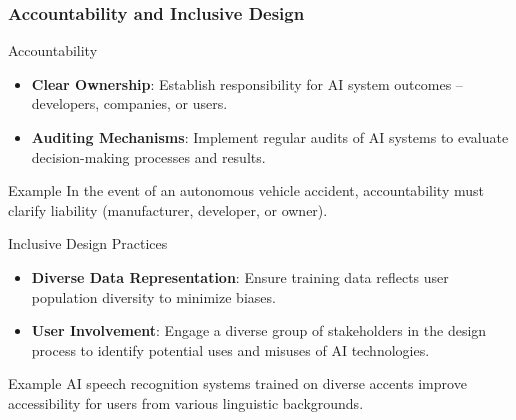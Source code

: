\documentclass[aspectratio=169]{beamer}
\begin{document}
\begin{frame}[fragile]
    \frametitle{Accountability and Inclusive Design}

    \begin{block}{Accountability}
        \begin{itemize}
            \item \textbf{Clear Ownership}: Establish responsibility for AI system outcomes – developers, companies, or users.
            \item \textbf{Auditing Mechanisms}: Implement regular audits of AI systems to evaluate decision-making processes and results.
        \end{itemize}
        \begin{block}{Example}
            In the event of an autonomous vehicle accident, accountability must clarify liability (manufacturer, developer, or owner).
        \end{block}
    \end{block}

    \begin{block}{Inclusive Design Practices}
        \begin{itemize}
            \item \textbf{Diverse Data Representation}: Ensure training data reflects user population diversity to minimize biases.
            \item \textbf{User Involvement}: Engage a diverse group of stakeholders in the design process to identify potential uses and misuses of AI technologies.
        \end{itemize}
        \begin{block}{Example}
            AI speech recognition systems trained on diverse accents improve accessibility for users from various linguistic backgrounds.
        \end{block}
    \end{block}
\end{frame}
\end{document}
